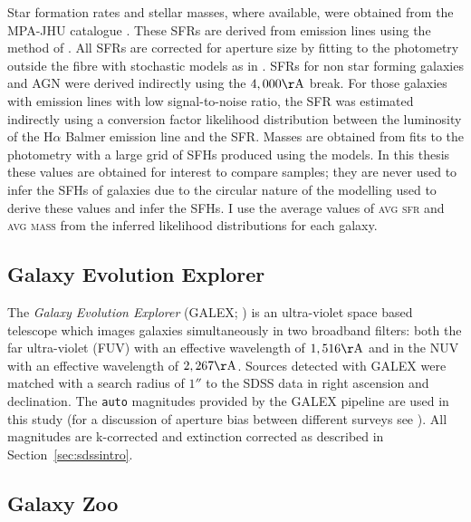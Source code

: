 Star formation rates and stellar masses, where available, were obtained from the MPA-JHU catalogue \citep{kauffmann03, brinchmann04}. These SFRs are derived from emission lines using the method of \cite{charlot01}. All SFRs are corrected for aperture size by fitting to the photometry outside the fibre with stochastic models as in \cite{Salim07}. SFRs for non star forming galaxies and AGN were derived indirectly using the $4,000\rm{\AA}$ break. For those galaxies with emission lines with low signal-to-noise ratio, the SFR was estimated indirectly using a conversion factor likelihood distribution between the luminosity of the H$\alpha$ Balmer emission line and the SFR. Masses are obtained from fits to the photometry with a large grid of SFHs produced using the \cite{BC03} models. In this thesis these values are obtained for interest to compare samples; they are never used to infer the SFHs of galaxies due to the circular nature of the modelling used to derive these values and infer the SFHs. I use the average values of \textsc{avg sfr} and \textsc{avg mass} from the inferred likelihood distributions for each galaxy.

\subsection{Galaxy Evolution Explorer}\label{sec:galexintro}

The \emph{Galaxy Evolution Explorer} (GALEX; \citealt{Martin05}) is an ultra-violet space based telescope which images galaxies simultaneously in two broadband filters: both the far ultra-violet (FUV) with an effective wavelength of $1,516\rm{\AA}$ and in the NUV with an effective wavelength of $2,267\rm{\AA}$. Sources detected with GALEX were matched with a search radius of $1''$ to the SDSS data in right ascension and declination. The {\tt auto} magnitudes provided by the GALEX pipeline are used in this study (for a discussion of aperture bias between different surveys see \citealt{hill11}). All magnitudes are k-corrected and extinction corrected as described in Section~\ref{sec:sdssintro}.

\subsection{Galaxy Zoo}\label{sec:GZ}

